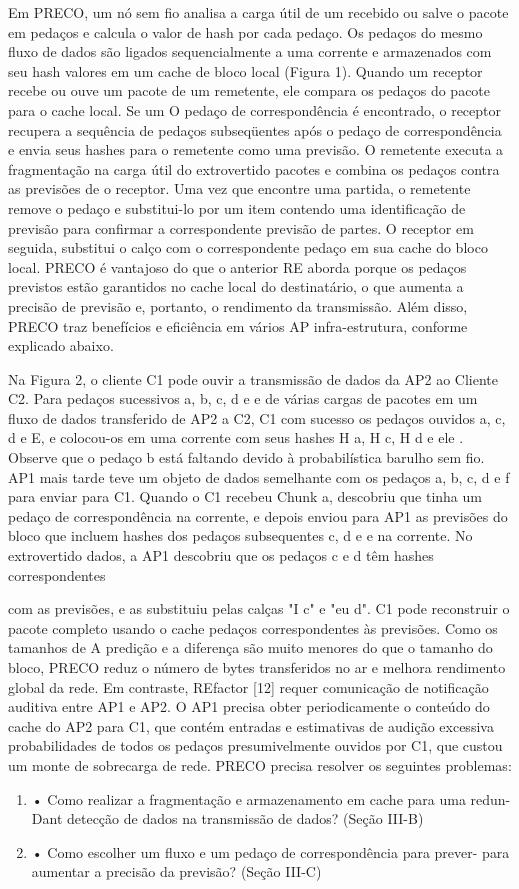 \documentclass[12pt]{article}
\begin{document}
Em PRECO, um nó sem fio analisa a carga útil de um recebido
ou salve o pacote em pedaços e calcula o valor de hash
por cada pedaço. Os pedaços do mesmo fluxo de dados são
ligados sequencialmente a uma corrente e armazenados com seu hash
valores em um cache de bloco local (Figura 1). Quando um receptor
recebe ou ouve um pacote de um remetente, ele compara
os pedaços do pacote para o cache local. Se um
O pedaço de correspondência é encontrado, o receptor recupera a sequência
de pedaços subseqüentes após o pedaço de correspondência e envia seus
hashes para o remetente como uma previsão.
O remetente executa a fragmentação na carga útil do extrovertido
pacotes e combina os pedaços contra as previsões de
o receptor. Uma vez que encontre uma partida, o remetente remove o
pedaço e substitui-lo por um item contendo uma identificação de previsão
para confirmar a correspondente previsão de partes. O receptor
em seguida, substitui o calço com o correspondente pedaço em sua
cache do bloco local. PRECO é vantajoso do que o anterior
RE aborda porque os pedaços previstos estão garantidos
no cache local do destinatário, o que aumenta a
precisão de previsão e, portanto, o rendimento da transmissão.
Além disso, PRECO traz benefícios e eficiência em vários AP
infra-estrutura, conforme explicado abaixo.


Na Figura 2, o cliente C1 pode ouvir a transmissão de dados
da AP2 ao Cliente C2. Para pedaços sucessivos a, b, c, d e
e de várias cargas de pacotes em um fluxo de dados transferido
de AP2 a C2, C1 com sucesso os pedaços ouvidos a, c, d e
E, e colocou-os em uma corrente com seus hashes H a, H c, H d
e ele . Observe que o pedaço b está faltando devido à probabilística
barulho sem fio. AP1 mais tarde teve um objeto de dados semelhante
com os pedaços a, b, c, d e f para enviar para C1. Quando o C1 recebeu
Chunk a, descobriu que tinha um pedaço de correspondência na corrente,
e depois enviou para AP1 as previsões do bloco que incluem hashes
dos pedaços subsequentes c, d e e na corrente. No extrovertido
dados, a AP1 descobriu que os pedaços c e d têm hashes correspondentes


com as previsões, e as substituiu pelas calças "I c"
e "eu d". C1 pode reconstruir o pacote completo usando o cache
pedaços correspondentes às previsões. Como os tamanhos de
A predição e a diferença são muito menores do que o tamanho do bloco, PRECO
reduz o número de bytes transferidos no ar e melhora
rendimento global da rede. Em contraste, REfactor [12] requer
comunicação de notificação auditiva entre AP1 e
AP2. O AP1 precisa obter periodicamente o conteúdo do cache do AP2
para C1, que contém entradas e estimativas de audição excessiva
probabilidades de todos os pedaços presumivelmente ouvidos por C1, que
custou um monte de sobrecarga de rede.
PRECO precisa resolver os seguintes problemas:
\begin{enumerate}
	\item 
	• Como realizar a fragmentação e armazenamento em cache para uma redun-
	Dant detecção de dados na transmissão de dados? (Seção III-B)
		\item
	• Como escolher um fluxo e um pedaço de correspondência para prever-
	para aumentar a precisão da previsão? (Seção III-C)
\end{enumerate}
\end{document}
